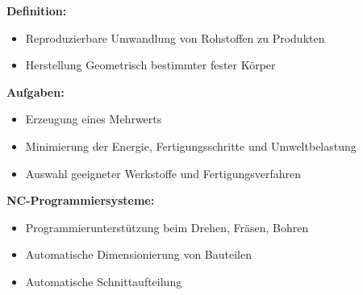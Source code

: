 \textbf{Definition:}
\begin{itemize}
    \item Reproduzierbare Umwandlung von Rohstoffen zu Produkten
    \item Herstellung Geometrisch bestimmter fester Körper
\end{itemize}

\textbf{Aufgaben:}
\begin{itemize}
    \item Erzeugung eines Mehrwerts
    \item Minimierung der Energie, Fertigungsschritte und Umweltbelastung
    \item Auswahl geeigneter Werkstoffe und Fertigungsverfahren
\end{itemize}

\textbf{NC-Programmiersysteme:}
\begin{itemize}
    \item Programmierunterstützung beim Drehen, Fräsen, Bohren
    \item Automatische Dimensionierung von Bauteilen
    \item Automatische Schnittaufteilung
\end{itemize}